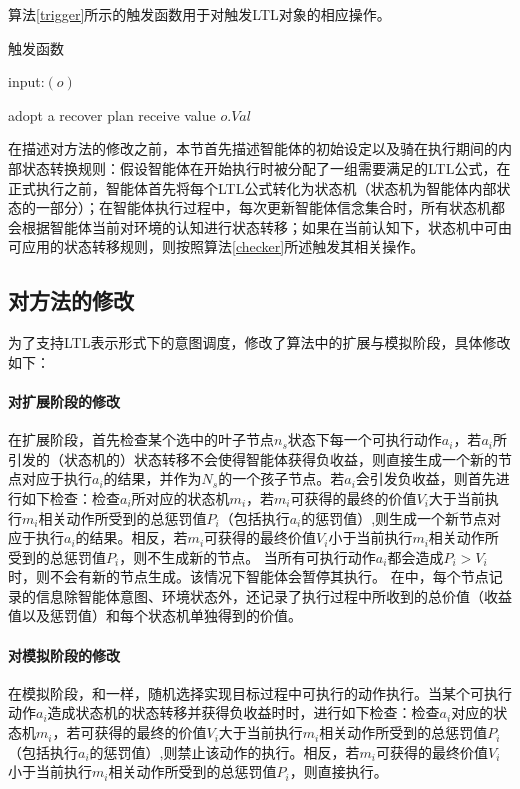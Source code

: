 算法\ref{trigger}所示的触发函数用于对触发LTL对象的相应操作。
\begin{algorithm} %
\caption{触发函数}\label{trigger}
\begin{algorithmic}[1]
\STATE input:$(o)$

\STATE adopt a recover plan
\ELSE
{}
\STATE receive value $o.Val$
\ENDIF
\ENDIF

\end{algorithmic}
\end{algorithm}

在描述对\SA 方法的修改之前，本节首先描述智能体的初始设定以及骑在执行期间的内部状态转换规则：假设智能体在开始执行时被分配了一组需要满足的LTL公式，在正式执行之前，智能体首先将每个LTL公式转化为状态机（状态机为智能体内部状态的一部分）；在智能体执行过程中，每次更新智能体信念集合时，所有状态机都会根据智能体当前对环境的认知进行状态转移；如果在当前认知下，状态机中可由可应用的状态转移规则，则按照算法\ref{checker}所述触发其相关操作。

\subsection{对\SA 方法的修改}
为了支持LTL表示形式下的意图调度，\SAT 修改了\SA 算法中的扩展与模拟阶段，具体修改如下：
\paragraph{对扩展阶段的修改}
在扩展阶段，\SAT 首先检查某个选中的叶子节点$n_s$状态下每一个可执行动作$a_i$，若$a_i$所引发的（状态机的）状态转移不会使得智能体获得负收益，则直接生成一个新的节点对应于执行$a_i$的结果，并作为$N_s$的一个孩子节点。若$a_i$会引发负收益，则首先进行如下检查：检查$a_i$所对应的状态机$m_i$，若$m_i$可获得的最终的价值$V_i$大于当前执行$m_i$相关动作所受到的总惩罚值$P_i$（包括执行$a_i$的惩罚值）,则生成一个新节点对应于执行$a_i$的结果。相反，若$m_i$可获得的最终价值$V_i$小于当前执行$m_i$相关动作所受到的总惩罚值$P_i$，则不生成新的节点。
%
当所有可执行动作$a_i$都会造成$P_i > V_i$时，则不会有新的节点生成。该情况下智能体会暂停其执行。
%
在\SAT 中，每个节点记录的信息除智能体意图、环境状态外，还记录了执行过程中所收到的总价值（收益值以及惩罚值）和每个状态机单独得到的价值。

\paragraph{对模拟阶段的修改}
在模拟阶段，\SAT 和\SA 一样，随机选择实现目标过程中可执行的动作执行。当某个可执行动作$a_i$造成状态机的状态转移并获得负收益时时，进行如下检查：检查$a_i$对应的状态机$m_i$，若可获得的最终的价值$V_i$大于当前执行$m_i$相关动作所受到的总惩罚值$P_i$（包括执行$a_i$的惩罚值）,则禁止该动作的执行。相反，若$m_i$可获得的最终价值$V_i$小于当前执行$m_i$相关动作所受到的总惩罚值$P_i$，则直接执行。


